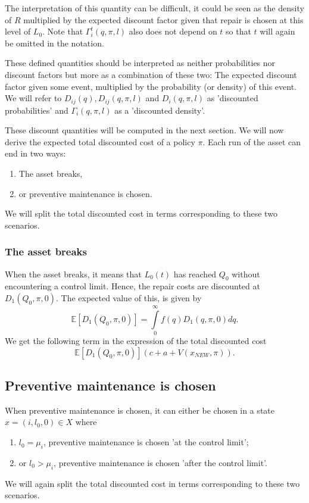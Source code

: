 The interpretation of this quantity can be difficult, it could be seen as the density of $R$ multiplied by the expected discount factor given that repair is chosen at this level of $L_0$.
Note that $\Gamma_i^t(q,\pi,l)$ also does not depend on $t$ so that $t$ will again be omitted in the notation.
\begin{remark}
	These defined quantities should be interpreted as neither probabilities nor discount factors but more as a combination of these two: The expected discount factor given some event, multiplied by the probability (or density) of this event.
	We will refer to $D_{ij}(q),D_{ij}(q,\pi,l)$ and $D_{i}(q,\pi,l)$ as 'discounted probabilities' and $\Gamma_i(q,\pi,l)$ as a 'discounted density'.
\end{remark}
These discount quantities will be computed in the next section.
We will now derive the expected total discounted cost of a policy $\pi$.
Each run of the asset can end in two ways:
\begin{enumerate}
	\item The asset breaks,
	\item or preventive maintenance is chosen.
\end{enumerate}
We will split the total discounted cost in terms corresponding to these two scenarios.

\subsubsection{The asset breaks}
When the asset breaks, it means that $L_0(t)$ has reached $Q_0$ without encountering a control limit.
Hence, the repair costs are discounted at $D_1(Q_0,\pi,0)$.
The expected value of this, is given by
\[
\mathbb{E}[D_{1}(Q_0,\pi,0)]=\int\limits_0^\infty f(q)D_{1}(q,\pi,0)dq.
\]
We get the following term in the expression of the total discounted cost
\[
\mathbb{E}[D_{1}(Q_0,\pi,0)](c+a+V(x_{NEW},\pi)).
\]

\subsection{Preventive maintenance is chosen}
When preventive maintenance is chosen, it can either be chosen in a state $x=(i,l_0,0)\in X$ where
\begin{enumerate}
	\item $l_0=\mu_i$, preventive maintenance is chosen 'at the control limit';
	\item or $l_0>\mu_i$, preventive maintenance is chosen 'after the control limit'.
\end{enumerate}
We will again split the total discounted cost in terms corresponding to these two scenarios.

